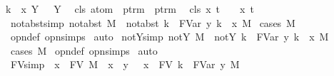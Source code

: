 \begin{isabellebody}
{\isachardoublequoteopen}{\isacharbraceleft}k\ {\isacharless}{\isacharminus}\ x{\isacharbraceright}\ {\isacharparenleft}Y\ {\isasymsigma}{\isacharparenright}\ {\isacharequal}\ Y\ {\isasymsigma}{\isachardoublequoteclose}\isanewline
\isanewline
{}\isamarkupfalse%
\ cls{\isacharprime}{\isacharcolon}{\isacharcolon}\ {\isachardoublequoteopen}atom\ {\isasymRightarrow}\ ptrm\ {\isasymRightarrow}\ ptrm{\isachardoublequoteclose}\ {\isacharparenleft}{\isachardoublequoteopen}{\isacharbackslash}{\isacharunderscore}{\isacharcircum}{\isacharunderscore}{\isachardoublequoteclose}{\isacharparenright}\ \isanewline
{\isachardoublequoteopen}cls{\isacharprime}\ x\ t\ {\isasymequiv}\ {\isacharbraceleft}{}\ {\isacharless}{\isacharminus}\ x{\isacharbraceright}\ t{\isachardoublequoteclose}\isanewline
\isanewline
{}\isamarkupfalse%
\ not{\isacharunderscore}abst{\isacharunderscore}simp{\isacharcolon}\ {\isachardoublequoteopen}not{\isacharunderscore}abst\ M\ {\isasymLongrightarrow}\ not{\isacharunderscore}abst\ {\isacharbraceleft}k\ {\isasymrightarrow}\ FVar\ y{\isacharbraceright}\ {\isacharbraceleft}k\ {\isacharless}{\isacharminus}\ x{\isacharbraceright}\ M{\isachardoublequoteclose}\isanewline
%
\isadelimproof
%
\endisadelimproof
%
\isatagproof
{}\isamarkupfalse%
\ {\isacharparenleft}cases\ M{\isacharparenright}\isanewline
{}\isamarkupfalse%
\ opn{\isacharprime}{\isacharunderscore}def\ opn{\isachardot}simps\isanewline
{}\isamarkupfalse%
\ auto%
\endisatagproof
{\isafoldproof}%
%
\isadelimproof
\isanewline
%
\endisadelimproof
\isanewline
{}\isamarkupfalse%
\ not{\isacharunderscore}Y{\isacharunderscore}simp{\isacharcolon}\ {\isachardoublequoteopen}not{\isacharunderscore}Y\ M\ {\isasymLongrightarrow}\ not{\isacharunderscore}Y\ {\isacharbraceleft}k\ {\isasymrightarrow}\ FVar\ y{\isacharbraceright}\ {\isacharbraceleft}k\ {\isacharless}{\isacharminus}\ x{\isacharbraceright}\ M{\isachardoublequoteclose}\isanewline
%
\isadelimproof
%
\endisadelimproof
%
\isatagproof
{}\isamarkupfalse%
\ {\isacharparenleft}cases\ M{\isacharparenright}\isanewline
{}\isamarkupfalse%
\ opn{\isacharprime}{\isacharunderscore}def\ opn{\isachardot}simps\isanewline
{}\isamarkupfalse%
\ auto%
\endisatagproof
{\isafoldproof}%
%
\isadelimproof
\isanewline
%
\endisadelimproof
\isanewline
{}\isamarkupfalse%
\ FV{\isacharunderscore}simp{\isacharcolon}\ {\isachardoublequoteopen}{\isasymlbrakk}\ x\ {\isasymnotin}\ FV\ M\ {\isacharsemicolon}\ x\ {\isasymnoteq}\ y\ {\isasymrbrakk}\ {\isasymLongrightarrow}\ x\ {\isasymnotin}\ FV\ {\isacharbraceleft}k\ {\isasymrightarrow}\ FVar\ y{\isacharbraceright}\ M{\isachardoublequoteclose}\isanewline

\end{isabellebody}

